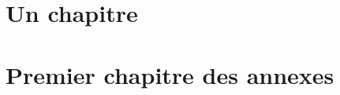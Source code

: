 \documentclass{book}
\begin{document}
\chapter{Un chapitre}

\renewcommand{\appendixname}{Apppppppendix}
\appendix

\chapter{Premier chapitre des annexes}
\end{document}
